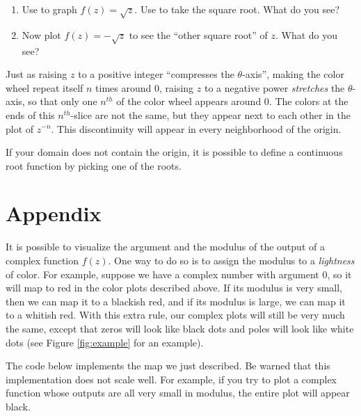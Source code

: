 \begin{problem}
\begin{enumerate}
\item Use  to graph $f(z) = \sqrt{z}$.
Use  to take the square root.
What do you see?
\item Now plot $f(z) = -\sqrt{z}$ to see the ``other square root'' of $z$. What do you see?
\end{enumerate}
\end{problem}

Just as raising $z$ to a positive integer ``compresses the $\theta$-axis'', making the color wheel repeat itself $n$ times around 0, raising $z$ to a negative power \emph{stretches} the $\theta$-axis, so that only one $n^{th}$ of the color wheel appears around 0.
The colors at the ends of this $n^{th}$-slice are not the same, but they appear next to each other in the plot of $z^{-n}$.
This discontinuity will appear in every neighborhood of the origin. 


If your domain does not contain the origin, it is possible to define a continuous root function by picking one of the roots.


\section*{Appendix}
It is possible to visualize the argument and the modulus of the output of a complex function $f(z)$. 
One way to do so is to assign the modulus to a \emph{lightness} of color.
For example, suppose we have a complex number with argument 0, so it will map to red in the color plots described above.
If its modulus is very small, then we can map it to a blackish red, and if its modulus is large, we can map it to a whitish red.
With this extra rule, our complex plots will still be very much the same, except that zeros will look like black dots and poles will look like white dots (see Figure \ref{fig:example} for an example).

The code below implements the map we just described.
Be warned that this implementation does not scale well.
For example, if you try to plot a complex function whose outputs are all very small in modulus, the entire plot will appear black.


